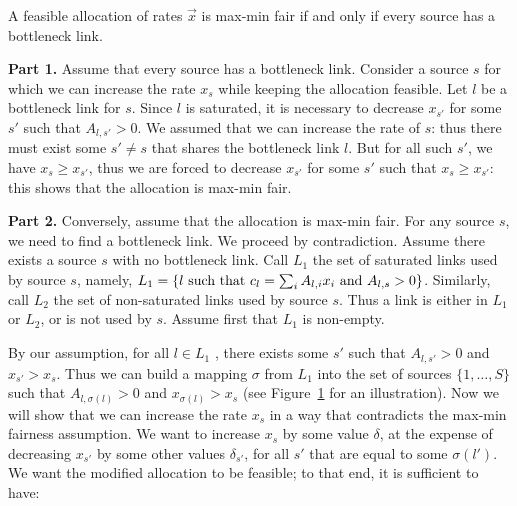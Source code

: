 \begin{theorem}
        A feasible allocation of rates $\vec{x}$ is max-min fair if and
        only if every source has a bottleneck link.
        \label{theo-bn}
\end{theorem}
\pr \textbf{Part 1.}  Assume that every source has a bottleneck
link. Consider a source $s$ for which we can increase the rate
$x_{s}$ while keeping the allocation feasible. Let $l$ be a
bottleneck link for $s$. Since $l$ is saturated, it is necessary
to decrease $x_{s'}$ for some $s'$ such that $A_{l,s'} >0$. We
assumed that we can increase the rate of $s$: thus there must
exist some $s' \neq s$ that shares the bottleneck link $l$. But
for all such $s'$, we have $x_{s}\geq x_{s'}$, thus we are forced
to decrease $x_{s'}$ for some $s'$ such that $x_{s}\geq x_{s'}$:
this shows that the allocation is max-min fair.

\textbf{Part 2.} Conversely, assume that the allocation is max-min
fair.  For any source $s$, we need to find a bottleneck link.  We
proceed by contradiction.  Assume there exists a source $s$ with
no bottleneck link.  Call $L_{1}$ the set of saturated links used
by source $s$, namely, $L_{1} = \{l \textrm{ such that } c_{l}=
\sum_{i}A_{l,i}x_{i} \textrm{ and } A_{l,s} > 0 \}$.  Similarly, call
$L_{2}$ the set of non-saturated links used by source $s$. Thus a
link is either in $L_{1}$ or $L_{2}$, or is not used by $s$.
Assume first that $L_1$ is non-empty.

\begin{figure}[h]
        \protect\label{fig-sigma}
\end{figure}

By our assumption, for all $l \in L_{1}$ , there exists some
$s'$ such that $A_{l,s'} >0$ and $x_{s'} > x_{s}$. Thus we can
build a mapping $\sigma$ from $L_{1}$ into the set of sources
$\{1,\ldots,S \}$ such that $A_{l,\sigma(l)} >0$ and
$x_{\sigma(l)} > x_{s}$ (see Figure~\ref{fig-sigma} for an
illustration). Now we will show that we can increase the rate
$x_{s}$ in a way that contradicts the max-min fairness
assumption. We want to increase $x_{s}$ by some value
$\delta$, at the expense of decreasing $x_{s'}$ by some other
values $\delta_{s'}$, for all $s'$ that are equal to some
$\sigma(l')$. We want the modified allocation to be feasible;
to that end, it is sufficient to have:

